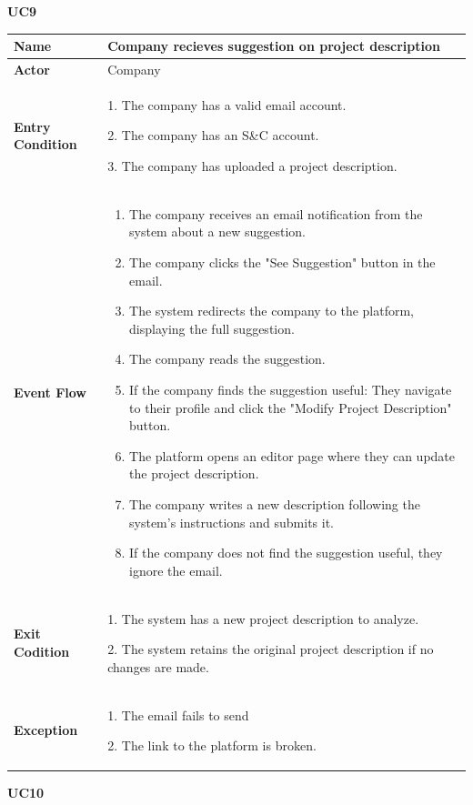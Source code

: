 \textbf{UC9}
\begin{longtable}{|p{}|p{}|}
\hline
\textbf{Name} &  Company recieves suggestion on project description\\
\hline
\textbf{Actor} &  Company\\
\hline
\textbf{Entry Condition} &  
1. The company has a valid email account.

2. The company has an S\&C account.

3. The company has uploaded a project description.\\
\hline
\textbf{Event Flow} &  
\begin{enumerate}
    \item The company receives an email notification from the system about a new suggestion.
    \item The company clicks the "See Suggestion" button in the email.
    \item The system redirects the company to the platform, displaying the full suggestion.
    \item The company reads the suggestion.
    \item  If the company finds the suggestion useful: They navigate to their profile and click the "Modify Project Description" button.
    \item The platform opens an editor page where they can update the project description.
    \item The company writes a new description following the system’s instructions and submits it.
    \item If the company does not find the suggestion useful, they ignore the email.
\end{enumerate}\\
\hline
\textbf{Exit Codition} &  
1. The system has a new project description to analyze.

2. The system retains the original project description if no changes are made.\\
\hline
\textbf{Exception} &  
1. The email fails to send

2. The link to the platform is broken.\\
\hline
\end{longtable}

\textbf{UC10}

